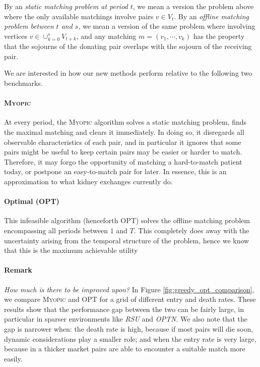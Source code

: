 \begin{itemize}
By an \emph{static matching problem at period $t$}, we mean a version the problem above where the only available matchings involve pairs $v \in V_{t}$. By an \emph{offline matching problem between $t$ and $s$}, we mean a version of the same problem where involving vertices $v \in \cup_{k=0}^{s} V_{t+k}$, and any matching $m = (v_{1}, \cdots, v_{k})$ has the property that the sojourns of the donating pair overlaps with the sojourn of the receiving pair.

We are interested in how our new methods perform relative to the following two benchmarks.

\paragraph{\textsc{Myopic}} At every period, the \textsc{Myopic} algorithm solves a static matching problem, finds the maximal matching and clears it immediately. In doing so, it disregards all observable characteristics of each pair, and in particular it ignores that some pairs might be useful to keep certain pairs may be easier or harder to match. Therefore, it may forgo the opportunity of matching a hard-to-match patient today, or postpone an easy-to-match pair for later. In essence, this is an approximation to what kidney exchanges currently do.

\paragraph{Optimal (\textsc{OPT})} This infeasible algorithm (henceforth OPT) solves the offline matching problem encompassing all periods between $1$ and $T$. This completely does away with the uncertainty arising from the temporal structure of the problem, hence we know that this is the maximum achievable utility 

\paragraph{\textbf{Remark}} \textit{How much is there to be improved upon?} In Figure \ref{fig:greedy_opt_comparison}, we compare \textsc{Myopic} and \textsc{OPT} for a grid of different entry and death rates. These results show that the performance gap between the two can be fairly large, in particular in sparser environments like \emph{RSU} and \emph{OPTN}. We also note that the gap is narrower when: the death rate is high, because if most pairs will die soon, dynamic considerations play a smaller role; and when the entry rate is very large, because in a thicker market pairs are able to encounter a suitable match more easily.


\end{itemize}
